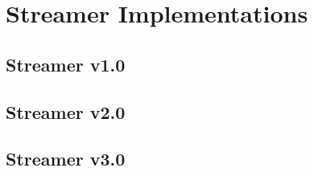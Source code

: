 \chapter{Streamer Implementations}
\label{chpt:Streamer}

\section{Streamer v1.0}
\label{sec:Streamer-1.0}

\section{Streamer v2.0}
\label{sec:Streamer-2.0}

\section{Streamer v3.0}
\label{sec:Streamer-3.0}
